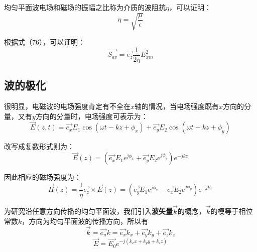 \documentclass[UTF8,a4paper,11pt]{article}
\begin{document}
均匀平面波电场和磁场的振幅之比称为介质的波阻抗$\eta$，可以证明：
\begin{equation}
\eta=\sqrt{\frac{\mu}{\epsilon}}
\end{equation}

根据式（76），可以证明：
\begin{equation}
\overrightarrow{S_{av}}=\overrightarrow{e_z}\frac{1}{2\eta}E_{xm}^2
\end{equation}

\subsection{波的极化}
很明显，电磁波的电场强度肯定有不全在$x$轴的情况，当电场强度既有$x$方向的分量，又有$y$方向的分量时，电场强度可表示为：
\begin{equation}
\overrightarrow{E}(z,t)=\overrightarrow{e_x}E_1\cos(\omega t-kz+\phi_x)+\overrightarrow{e_y}E_2\cos(\omega t-kz+\phi_y)
\end{equation}

改写成复数形式则为：
\begin{equation}
\overrightarrow{E}(z)=(\overrightarrow{e_x}E_1e^{j\phi_x}+\overrightarrow{e_y}E_2e^{j\phi_y})e^{-jkz}
\end{equation}

因此相应的磁场强度为：
\begin{equation}
\overrightarrow{H}(z)=\frac{1}{\eta}\overrightarrow{e_z}\times\overrightarrow{E}(z)=(\overrightarrow{e_y}E_1e^{j\phi_x}-\overrightarrow{e_x}E_2e^{j\phi_y})e^{-jkz}
\end{equation}

为研究沿任意方向传播的均匀平面波，我们引入\textbf{波矢量}$\overrightarrow{k}$的概念，$\overrightarrow{k}$的模等于相位常数$k$，方向为均匀平面波的传播方向，所以有
\begin{equation}
\overrightarrow{k}=\overrightarrow{e_n}k=\overrightarrow{e_x}k_x+\overrightarrow{e_y}k_y+\overrightarrow{e_z}k_z
\end{equation}
\begin{equation}
\overrightarrow{E}=\overrightarrow{E_0}e^{-j(k_xx+k_yy+k_zz)}
\end{equation}
\end{document}
